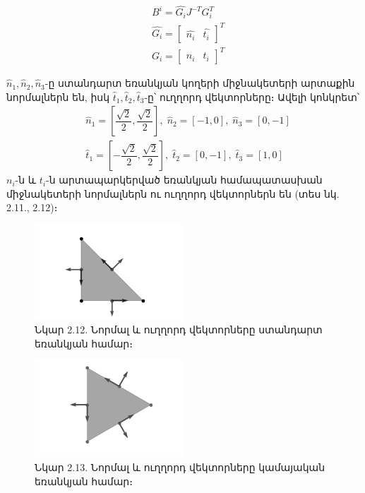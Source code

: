 \documentclass[fleqn, bachelor,subf,12pt,notitlepage]{article}
\begin{document}
\begin{equation}
\begin{aligned}
&B^{i} = \hat{G_{i}}J^{-T}G_{i}^{T} \\
&\hat{G_{i}} = \begin{bmatrix}
			\hat{n_{i}} & \hat{t_{i}}
		     \end{bmatrix}^{T}\\
&G_{i} = \begin{bmatrix}
			n_{i} & t_{i}
	    \end{bmatrix}^{T}
\end{aligned}
\end{equation}

$\hat{n}_{1}, \hat{n}_{2}, \hat{n}_{3}$-ը ստանդարտ եռանկյան կողերի միջնակետերի արտաքին նորմալներն են, իսկ $\hat{t}_{1}, \hat{t}_{2}, \hat{t}_{3}$-ը՝ ուղղորդ վեկտորները։ Ավելի կոնկրետ՝
\begin{equation}
\begin{aligned}
				&\hat{n}_{1}=\left[\dfrac{\sqrt{2}}{2}, \dfrac{\sqrt{2}}{2}\right], \; \hat{n}_{2}=\left[-1, 0\right], \; \hat{n}_{3}=\left[0, -1\right] \\
				&\hat{t}_{1}=\left[-\dfrac{\sqrt{2}}{2}, \dfrac{\sqrt{2}}{2}\right], \; \hat{t}_{2}=\left[0, -1\right], \; \hat{t}_{3}=\left[1, 0\right]
\end{aligned}
\end{equation}
$n_{i}$-ն և $t_{i}$-ն արտապարկերված եռանկյան համապատասխան միջնակետերի նորմալներն ու ուղղորդ վեկտորներն են (տես նկ. 2.11., 2.12)։
\begin{figure}[H]
\centering
\includegraphics[width=0.5\textwidth]{images/standard_triangle_vecs}
\captionsetup{labelformat=empty}
\caption{Նկար 2.12. Նորմալ և ուղղորդ վեկտորները ստանդարտ եռանկյան համար։}
\end{figure}
\begin{figure}[H]
\centering
\includegraphics[width=0.5\textwidth]{images/arb_triangle_vecs}
\captionsetup{labelformat=empty}
\caption{Նկար 2.13. Նորմալ և ուղղորդ վեկտորները կամայական եռանկյան համար։}
\end{figure}
\end{document}
